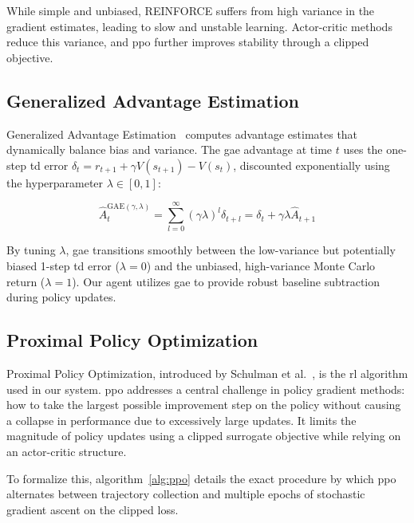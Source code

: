 While simple and unbiased, REINFORCE suffers from high variance in the gradient estimates, leading to slow and unstable learning. Actor-critic methods reduce this variance, and \gls{ppo} further improves stability through a clipped objective.

\subsection{Generalized Advantage Estimation}

Generalized Advantage Estimation~\cite{schulman2015gae} computes advantage estimates that dynamically balance bias and variance. The \gls{gae} advantage at time $t$ uses the one-step \gls{td} error $\delta_t = r_{t+1} + \gamma V(s_{t+1}) - V(s_t)$, discounted exponentially using the hyperparameter $\lambda \in [0, 1]$:

\begin{equation}
    \hat{A}_t^{\text{GAE}(\gamma, \lambda)} = \sum_{l=0}^{\infty} (\gamma \lambda)^l \delta_{t+l} = \delta_t + \gamma \lambda \hat{A}_{t+1}
\end{equation}

By tuning $\lambda$, \gls{gae} transitions smoothly between the low-variance but potentially biased 1-step \gls{td} error ($\lambda = 0$) and the unbiased, high-variance Monte Carlo return ($\lambda = 1$). Our agent utilizes \gls{gae} to provide robust baseline subtraction during policy updates.

\subsection{Proximal Policy Optimization}

Proximal Policy Optimization, introduced by Schulman et al.~\cite{schulman2017ppo}, is the \gls{rl} algorithm used in our system. \gls{ppo} addresses a central challenge in policy gradient methods: how to take the largest possible improvement step on the policy without causing a collapse in performance due to excessively large updates. It limits the magnitude of policy updates using a clipped surrogate objective while relying on an actor-critic structure.

To formalize this, algorithm~\ref{alg:ppo} details the exact procedure by which \gls{ppo} alternates between trajectory collection and multiple epochs of stochastic gradient ascent on the clipped loss.

